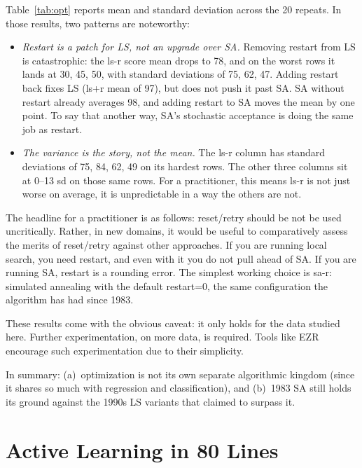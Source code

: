 \documentclass[AMA,STIX2COL]{WileyNJDv5}
\begin{document}
 Table~\ref{tab:opt} reports mean and standard
deviation across the 20 repeats. 
In those results, two patterns are noteworthy:
\begin{itemize}
\item
\textit{Restart is a patch for LS, not an upgrade over SA.}
Removing restart from LS is catastrophic: the \textsf{ls-r} score mean
drops to 78, and on the worst rows it lands at 30, 45, 50, with
standard deviations of 75, 62, 47.   Adding restart back fixes
LS (\textsf{ls+r} mean of 97), but does not push it past SA. SA
without restart already averages 98, and adding restart to SA
moves the mean by one point. 
To say that another way,  
SA's stochastic acceptance is doing
the same job as restart.
\item
\textit{The variance is the story, not the mean.} The \textsf{ls-r}
column has standard deviations of 75, 84, 62, 49 on its hardest
rows. The other three columns sit at 0--13 sd on those same rows.
For a practitioner, this means \textsf{ls-r} is not just worse on
average, it is unpredictable in a way the others are not.  
\end{itemize}
The headline for a practitioner is as follows:
 reset/retry should be not be used uncritically.
Rather, in new domains, it would be useful to comparatively
assess the merits of reset/retry against other approaches.
If you are running local search,
you need restart, and even with it you do not pull ahead of SA.
If you are running SA, restart is a rounding error. The simplest
working choice is \textsf{sa-r}: simulated annealing with the
default \textsf{restart=0}, the same configuration the algorithm
has had since 1983.

These results come with the obvious caveat: it only holds
for the data studied here. Further experimentation, on more data,
is required.  Tools like EZR encourage such experimentation
due to their simplicity.  

In summary: (a)~optimization is not its own
separate algorithmic kingdom (since it shares so much with regression and classification), 
and (b)~1983 SA still holds its ground against
the 1990s LS variants that claimed to surpass it.

\section{Active Learning in 80 Lines }\label{sec:active}
\end{document}
